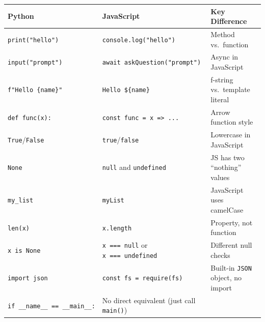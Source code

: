 \documentclass[
  justified,
  openright,
]{tufte-book}
\begin{document}
\begin{fullwidth}{\def\LTcaptype{none} %
\begin{longtable}[]{@{}
  >{\raggedright\arraybackslash}p{}
  >{\raggedright\arraybackslash}p{}
  >{\raggedright\arraybackslash}p{}@{}}
\toprule\noalign{}
\begin{minipage}[b]{\linewidth}\raggedright
Python
\end{minipage} & \begin{minipage}[b]{\linewidth}\raggedright
JavaScript
\end{minipage} & \begin{minipage}[b]{\linewidth}\raggedright
Key Difference
\end{minipage} \\
\midrule\noalign{}
\endhead
\bottomrule\noalign{}
\endlastfoot
\texttt{print("hello")} & \texttt{console.log("hello")} & Method
vs.~function \\
\texttt{input("prompt")} & \texttt{await\ askQuestion("prompt")} & Async
in JavaScript \\
\texttt{f"Hello\ \{name\}"} &
\texttt{\textasciigrave{}Hello\ \$\{name\}\textasciigrave{}} & f-string
vs.~template literal \\
\texttt{def\ func(x):} &
\texttt{const\ func\ =\ x\ =\textgreater{}\ ...} & Arrow function
style \\
\texttt{True}/\texttt{False} & \texttt{true}/\texttt{false} & Lowercase
in JavaScript \\
\texttt{None} & \texttt{null} and \texttt{undefined} & JS has two
``nothing'' values \\
\texttt{my\_list} & \texttt{myList} & JavaScript uses camelCase \\
\texttt{len(x)} & \texttt{x.length} & Property, not function \\
\texttt{x\ is\ None} & \texttt{x\ ===\ null} or
\texttt{x\ ===\ undefined} & Different null checks \\
\texttt{import\ json} &
\texttt{const\ fs\ =\ require(\textquotesingle{}fs\textquotesingle{})} &
Built-in \texttt{JSON} object, no import \\
\texttt{if\ \_\_name\_\_\ ==\ \textquotesingle{}\_\_main\_\_\textquotesingle{}:}
& No direct equivalent (just call \texttt{main()}) & \\
\end{longtable}
}
\end{fullwidth}
\end{document}
